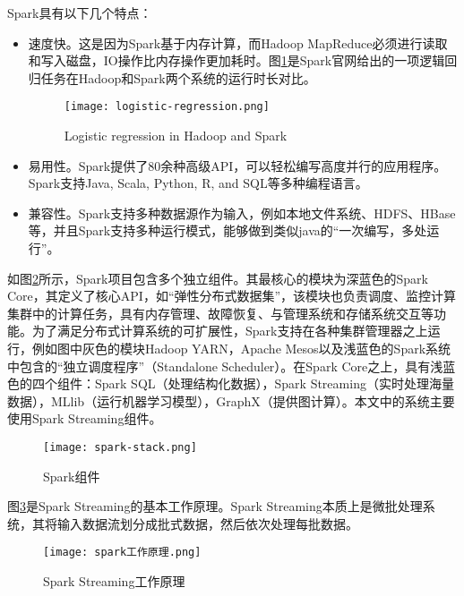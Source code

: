Spark具有以下几个特点：

\begin{itemize}
  \item 速度快。这是因为Spark基于内存计算，而Hadoop MapReduce必须进行读取和写入磁盘，IO操作比内存操作更加耗时。图\ref{fig:Logistic regression in Hadoop and Spark}是Spark官网给出的一项逻辑回归任务在Hadoop和Spark两个系统的运行时长对比。
   \begin{figure}
    \centering
    \texttt{[image: logistic-regression.png]}
    \caption{Logistic regression in Hadoop and Spark}
    \label{fig:Logistic regression in Hadoop and Spark}
  \end{figure}
  \item 易用性。Spark提供了80余种高级API，可以轻松编写高度并行的应用程序。Spark支持Java, Scala, Python, R, and SQL等多种编程语言。
  \item 兼容性。Spark支持多种数据源作为输入，例如本地文件系统、HDFS、HBase等，并且Spark支持多种运行模式，能够做到类似java的“一次编写，多处运行”。
\end{itemize}



如图\ref{fig:Spark组件}所示，Spark项目包含多个独立组件。其最核心的模块为深蓝色的Spark Core，其定义了核心API，如“弹性分布式数据集”，该模块也负责调度、监控计算集群中的计算任务，具有内存管理、故障恢复、与管理系统和存储系统交互等功能。为了满足分布式计算系统的可扩展性，Spark支持在各种集群管理器之上运行，例如图中灰色的模块Hadoop YARN，Apache Mesos以及浅蓝色的Spark系统中包含的“独立调度程序”（Standalone Scheduler）。在Spark Core之上，具有浅蓝色的四个组件：Spark SQL（处理结构化数据），Spark Streaming（实时处理海量数据），MLlib（运行机器学习模型），GraphX（提供图计算）。本文中的系统主要使用Spark Streaming组件。



\begin{figure}
  \centering
  \texttt{[image: spark-stack.png]}
  \caption{Spark组件}
  \label{fig:Spark组件}
\end{figure}

图\ref{fig:spark工作原理}是Spark Streaming的基本工作原理\cite{spark}。Spark Streaming本质上是微批处理系统，其将输入数据流划分成批式数据，然后依次处理每批数据。
\begin{figure}
  \centering
  \texttt{[image: spark工作原理.png]}
  \caption{Spark Streaming工作原理}
  \label{fig:spark工作原理}
\end{figure}

